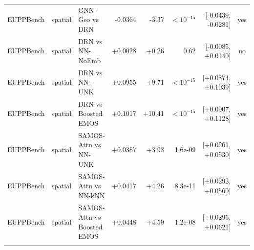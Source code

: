 \begin{table}[!htbp]
\begin{tabular}{lllrrrrc}
EUPPBench & spatial & GNN-Geo vs DRN & -0.0364 & -3.37 & $<10^{-15}$ & [-0.0439, -0.0281] & yes \\
EUPPBench & spatial & DRN vs NN-NoEmb & +0.0028 & +0.26 & 0.62 & [-0.0085, +0.0140] & no \\
EUPPBench & spatial & DRN vs NN-UNK & +0.0955 & +9.71 & $<10^{-15}$ & [+0.0874, +0.1039] & yes \\
EUPPBench & spatial & DRN vs Boosted EMOS & +0.1017 & +10.41 & $<10^{-15}$ & [+0.0907, +0.1128] & yes \\
EUPPBench & spatial & SAMOS-Attn vs NN-UNK & +0.0387 & +3.93 & 1.6e-09 & [+0.0261, +0.0530] & yes \\
EUPPBench & spatial & SAMOS-Attn vs NN-kNN & +0.0417 & +4.26 & 8.3e-11 & [+0.0292, +0.0560] & yes \\
EUPPBench & spatial & SAMOS-Attn vs Boosted EMOS & +0.0448 & +4.59 & 1.2e-08 & [+0.0296, +0.0621] & yes \\
\addlinespace
\bottomrule
\end{tabular}
\end{table}
